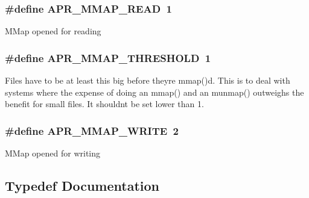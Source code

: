 \subsubsection[{\texorpdfstring{A\+P\+R\+\_\+\+M\+M\+A\+P\+\_\+\+R\+E\+AD}{APR_MMAP_READ}}]{\setlength{\rightskip}{0pt plus 5cm}\#define A\+P\+R\+\_\+\+M\+M\+A\+P\+\_\+\+R\+E\+AD~1}\hypertarget{group__apr__mmap_gac231fdf15d2d29802e0abbc5d0cf25b8}{}\label{group__apr__mmap_gac231fdf15d2d29802e0abbc5d0cf25b8}
M\+Map opened for reading 
\subsubsection[{\texorpdfstring{A\+P\+R\+\_\+\+M\+M\+A\+P\+\_\+\+T\+H\+R\+E\+S\+H\+O\+LD}{APR_MMAP_THRESHOLD}}]{\setlength{\rightskip}{0pt plus 5cm}\#define A\+P\+R\+\_\+\+M\+M\+A\+P\+\_\+\+T\+H\+R\+E\+S\+H\+O\+LD~1}\hypertarget{group__apr__mmap_ga19d1916e7b64bfb1a969648fe7b0846a}{}\label{group__apr__mmap_ga19d1916e7b64bfb1a969648fe7b0846a}
Files have to be at least this big before they\textquotesingle{}re mmap()d. This is to deal with systems where the expense of doing an mmap() and an munmap() outweighs the benefit for small files. It shouldn\textquotesingle{}t be set lower than 1. 
\subsubsection[{\texorpdfstring{A\+P\+R\+\_\+\+M\+M\+A\+P\+\_\+\+W\+R\+I\+TE}{APR_MMAP_WRITE}}]{\setlength{\rightskip}{0pt plus 5cm}\#define A\+P\+R\+\_\+\+M\+M\+A\+P\+\_\+\+W\+R\+I\+TE~2}\hypertarget{group__apr__mmap_gac2eb7f697d8bf190e630b85f967c8273}{}\label{group__apr__mmap_gac2eb7f697d8bf190e630b85f967c8273}
M\+Map opened for writing 

\subsection{Typedef Documentation}
